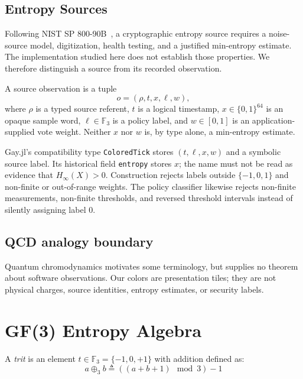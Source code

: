\documentclass[preprint,nohyperxmp]{iacrtrans}
\begin{document}
\subsection{Entropy Sources}

Following NIST SP 800-90B~\cite{nist80090b}, a cryptographic entropy source
requires a noise-source model, digitization, health testing, and a justified
min-entropy estimate. The implementation studied here does not establish those
properties. We therefore distinguish a source from its recorded observation.

\begin{definition}
A source observation is a tuple
\[
o=(\rho,t,x,\ell,w),
\]
where $\rho$ is a typed source referent, $t$ is a logical timestamp,
$x\in\{0,1\}^{64}$ is an opaque sample word, $\ell\in\mathbb F_3$ is a policy
label, and $w\in[0,1]$ is an application-supplied vote weight. Neither $x$ nor
$w$ is, by type alone, a min-entropy estimate.
\end{definition}

Gay.jl's compatibility type \texttt{ColoredTick} stores $(t,\ell,x,w)$ and a
symbolic source label. Its historical field \texttt{entropy} stores $x$; the
name must not be read as evidence that $H_\infty(X)>0$. Construction rejects
labels outside $\{-1,0,1\}$ and non-finite or out-of-range weights. The policy
classifier likewise rejects non-finite measurements, non-finite thresholds,
and reversed threshold intervals instead of silently assigning label $0$.

\subsection{QCD analogy boundary}

Quantum chromodynamics motivates some terminology, but supplies no theorem
about software observations. Our colors are presentation tiles; they are not
physical charges, source identities, entropy estimates, or security labels.

\section{GF(3) Entropy Algebra}
\label{sec:algebra}

\begin{definition}[Trit]
A \emph{trit} is an element $t \in \mathbb{F}_3 = \{-1, 0, +1\}$ with addition defined as:
\[
a \oplus_3 b \triangleq ((a + b + 1) \mod 3) - 1
\]
\end{definition}
\end{document}

